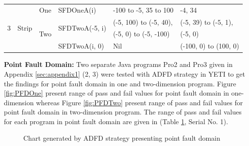 \begin{table}[h]
\begin{tabular}{|c|c|c|l|l|l|}
\multirow{5}{*}{3} 	&	\multirow{5}{*}{Strip}					& 	\multirow{2}{*}{One}			&	\multirow{2}{*}{SFDOneA(i)}	&	\multirow{2}{*}{-100 to -5, 35 to 100}		& 	\multirow{2}{*}{-4, 34	}\\ 
				&									&							&							&									&				\\  \cline{3-6}
				&									&	\multirow{3}{*}{Two}			&	\multirow{2}{*}{SFDTwoA(-5, i)}	&	(-5, 100) to (-5, 40),					&  (-5, 39) to (-5, 1), 			\\ 
				&									&							&							&	 (-5, 0) to (-5, -100)					&	(-5, 0)				\\ \cline{4-6}
				&									& 							&	SFDTwoA(i, 0)				&	Nil								&  (-100, 0) to (100, 0)			\\  \hline
				
				
\end{tabular}
\label{table:failtable}
\end{table}




\noindent \textbf{Point Fault Domain:}  Two separate Java programs Pro2 and Pro3 given in Appendix \ref{sec:appendix1} (2, 3) were tested with ADFD strategy in YETI to get the findings for point fault domain in one and two-dimension program. Figure \ref{fig:PFDOne} present range of pass and fail values for point fault domain in one-dimension whereas Figure \ref{fig:PFDTwo} present range of pass and fail values for point fault domain in two-dimension program. The range of pass and fail values for each program in point fault domain are given in (Table \ref{table:failtable}, Serial No. 1).

\begin{figure} [H]
\centering
{}

\caption{Chart generated by ADFD strategy presenting point fault domain}
\end{figure}


